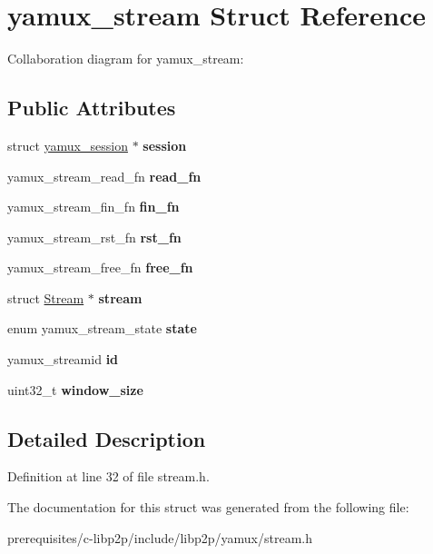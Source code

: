 \hypertarget{structyamux__stream}{}\section{yamux\+\_\+stream Struct Reference}
\label{structyamux__stream}


Collaboration diagram for yamux\+\_\+stream\+:
\subsection*{Public Attributes}
\begin{DoxyCompactItemize}
\item 
\mbox{\label{structyamux__stream_a7ee80da6b31eddb6869e9e5f6e1d8730}} 
struct \mbox{\hyperlink{structyamux__session}{yamux\+\_\+session}} $\ast$ {\bfseries session}
\item 
\mbox{\label{structyamux__stream_a59c40604645ffd87d9bfa01034711a2b}} 
yamux\+\_\+stream\+\_\+read\+\_\+fn {\bfseries read\+\_\+fn}
\item 
\mbox{\label{structyamux__stream_ac3f9c677c7a16a6b6f81bec6c4557fdc}} 
yamux\+\_\+stream\+\_\+fin\+\_\+fn {\bfseries fin\+\_\+fn}
\item 
\mbox{\label{structyamux__stream_a232f9e47ace1f673dc071fd1cf9b653a}} 
yamux\+\_\+stream\+\_\+rst\+\_\+fn {\bfseries rst\+\_\+fn}
\item 
\mbox{\label{structyamux__stream_a96cb744564ba4eb3265a339dbb894392}} 
yamux\+\_\+stream\+\_\+free\+\_\+fn {\bfseries free\+\_\+fn}
\item 
\mbox{\label{structyamux__stream_a242b7ccf232b40d3efedab2de5f06949}} 
struct \mbox{\hyperlink{struct_stream}{Stream}} $\ast$ {\bfseries stream}
\item 
\mbox{\label{structyamux__stream_a23193b8242b4bdb778725c595c882fc2}} 
enum yamux\+\_\+stream\+\_\+state {\bfseries state}
\item 
\mbox{\label{structyamux__stream_a235f67094d5922d8ba06c1f4951da02d}} 
yamux\+\_\+streamid {\bfseries id}
\item 
\mbox{\label{structyamux__stream_a28f5c4207a0182726867afd1594897f3}} 
uint32\+\_\+t {\bfseries window\+\_\+size}
\end{DoxyCompactItemize}


\subsection{Detailed Description}


Definition at line 32 of file stream.\+h.



The documentation for this struct was generated from the following file\+:\begin{DoxyCompactItemize}
\item 
prerequisites/c-\/libp2p/include/libp2p/yamux/stream.\+h\end{DoxyCompactItemize}
